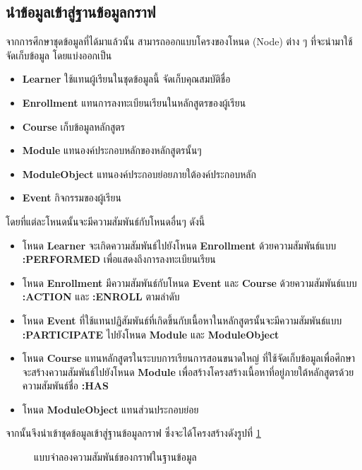 \documentclass[conference]{IEEEtran}
\def\moocs{การเรียนการสอนขนาดใหญ่}
\def\MOOCs{ระบบ{\moocs}}
\begin{document}
    \subsection{นำข้อมูลเข้าสู่ฐานข้อมูลกราฟ}
    
    จากการศึกษาชุดข้อมูลที่ได้มาแล้วนั้น สามารถออกแบบโครงของโหนด (Node) ต่าง ๆ 
    ที่จะนำมาใช้จัดเก็บข้อมูล โดยแบ่งออกเป็น
    \begin{itemize}
        \item \textbf{Learner} ใช้แทนผู้เรียนในชุดข้อมูลนี้ จัดเก็บคุณสมบัติชื่อ \textbf{}
        \item \textbf{Enrollment} แทนการลงทะเบียนเรียนในหลักสูตรของผู้เรียน
        \item \textbf{Course} เก็บข้อมูลหลักสูตร
        \item \textbf{Module} แทนองค์ประกอบหลักของหลักสูตรนั้นๆ
        \item \textbf{ModuleObject} แทนองค์ประกอบย่อยภายใต้องค์ประกอบหลัก
        \item \textbf{Event} กิจกรรมของผู้เรียน
    \end{itemize}


    โดยที่แต่ละโหนดนั้นจะมีความสัมพันธ์กับโหนดอื่นๆ ดังนี้ 
    \begin{itemize}
        \item โหนด \textbf{Learner} จะเกิดความสัมพันธ์ไปยังโหนด \textbf{Enrollment} ด้วยความสัมพันธ์แบบ \textbf{:PERFORMED} เพื่อแสดงถึงการลงทะเบียนเรียน
        \item โหนด \textbf{Enrollment} มีความสัมพันธ์กับโหนด \textbf{Event} และ \textbf{Course} ด้วยความสัมพันธ์แบบ \textbf{:ACTION} และ \textbf{:ENROLL} ตามลำดับ
        \item โหนด \textbf{Event} ที่ใช้แทนปฏิสัมพันธ์ที่เกิดขึ้นกับเนื้อหาในหลักสูตรนั้นจะมีความสัมพันธ์แบบ \textbf{:PARTICIPATE} ไปยังโหนด \textbf{Module} และ \textbf{ModuleObject}
        \item โหนด \textbf{Course} แทนหลักสูตรใน{\MOOCs} ที่ใช้จัดเก็บข้อมูลเพื่อศึกษา จะสร้างความสัมพันธ์ไปยังโหนด \textbf{Module} เพื่อสร้างโครงสร้างเนื้อหาที่อยู่ภายใต้หลักสูตรด้วยความสัมพันธ์ชื่อ \textbf{:HAS}
        \item โหนด \textbf{ModuleObject} แทนส่วนประกอบย่อย
    \end{itemize}

    จากนั้นจึงนำเข้าชุดข้อมูลเข้าสู่ฐานข้อมูลกราฟ ซึ่งจะได้โครงสร้างดังรูปที่ \ref{fig:graph-modeling}
    \begin{figure}[htbp]
        \caption{แบบจำลองความสัมพันธ์ของกราฟในฐานข้อมูล}
        \label{fig:graph-modeling}
    \end{figure}
\end{document}
